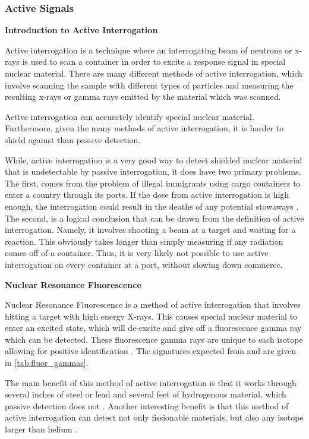 \documentclass{report}
\newcommand{\myparagraph}[1]{\paragraph*{#1\\}}
\begin{document}
\subsubsection{Active Signals}


\textbf{Introduction to Active Interrogation}


Active interrogation is a technique where an interrogating beam of neutrons or x-rays is used to scan a container in order to excite a response signal in special nuclear material. There are many different methods of active interrogation, which involve scanning the sample with different types of particles and measuring the resulting x-rays or gamma rays emitted by the material which was scanned.

Active interrogation can accurately identify special nuclear material. Furthermore, given the many methods of active interrogation, it is harder to shield against than passive detection.

While, active interrogation is a very good way to detect shielded nuclear material that is undetectable by passive interrogation, it does have two primary problems. The first, comes from the problem of illegal immigrants using cargo containers to enter a country through its ports. If the dose from active interrogation is high enough, the interrogation could result in the deaths of any potential stowaways \cite{Morse2014}. The second, is a logical conclusion that can be drawn from the definition of active interrogation. Namely, it involves shooting a beam at a target and waiting for a reaction. This obviously takes longer than simply measuring if any radiation comes off of a container. Thus, it is very likely not possible to use active interrogation on every container at a port, without slowing down commerce.

\textbf{Nuclear Resonance Fluorescence}

Nuclear Resonance Fluorescence is a method of active interrogation that involves hitting a target with high energy X-rays. This causes special nuclear material to enter an excited state, which will de-excite and give off a fluorescence gamma ray which can be detected. These fluorescence gamma rays are unique to each isotope allowing for positive identification \cite{Morse2014a}. The signatures expected from  and  are given in \autoref{tab:fluor_gammas}.

The main benefit of this method of active interrogation is that it works through several inches of steel or lead and several feet of hydrogenous material, which passive detection does not \cite{PhysRevC.78.041601}. Another interesting benefit is that this method of active interrogation can detect not only fissionable materials, but also any isotope larger than helium \cite{Bertozzi2005}.
\end{document}
